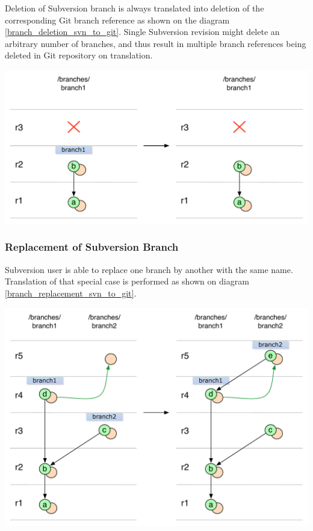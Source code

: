 Deletion of Subversion branch is always translated into deletion of the corresponding Git branch reference
as shown on the diagram \ref{branch_deletion_svn_to_git}. Single Subversion revision might delete an arbitrary number of branches, 
and thus result in multiple branch references being deleted in Git repository on translation.
\begin{center}
\includegraphics[width=\textwidth]{img/diagrams/branch_deletion_svn_to_git.pdf}%
\label{branch_deletion_svn_to_git}%
\end{center}

\subsubsection{Replacement of Subversion Branch}

Subversion user is able to replace one branch by another with the same name.
Translation of that special case is performed as shown on diagram \ref{branch_replacement_svn_to_git}.
\begin{center}
\includegraphics[width=\textwidth]{img/diagrams/branch_replacement_svn_to_git.pdf}%
\label{branch_replacement_svn_to_git}%
\end{center}

